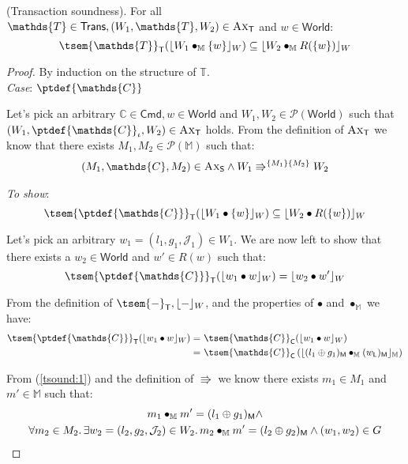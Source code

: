 \thm (Transaction soundness). For all $\mathds{T} \in \mathsf{Trans}, (W_1, \mathds{T}, W_2) \in \textsc{Ax}_\mathsf{T}$ and $w \in \mathsf{World}$:
\[
	\tsem{\mathds{T}}_\mathsf{T}(\lfloor W_1 \bullet_\mathbb{M} \{ w \} \rfloor_W) \subseteq \lfloor W_2 \bullet_\mathbb{M} R(\{ w \}) \rfloor_W
\]

{\parindent0pt
\begin{proof}
By induction on the structure of $\mathds{T}$. \\	

\textit{Case}: $\ptdef{\mathds{C}}$

Let's pick an arbitrary $\mathds{C} \in \mathsf{Cmd}, w \in \mathsf{World}$ and $W_1, W_2 \in \mathcal{P}(\mathsf{World})$ such that $(W_1, \ptdef{\mathds{C}}_\iota, W_2) \in \textsc{Ax}_\mathsf{T}$ holds. From the definition of $\textsc{Ax}_\mathsf{T}$ we know that there exists $M_1, M_2 \in \mathcal{P}(\mathbb{M})$ such that:
\begin{gather}\label{tsound:1}
	(M_1, \mathds{C}, M_2) \in \textsc{Ax}_\mathsf{S} \land W_1 \Rrightarrow^{\{M_1\}\{M_2\}} W_2
\end{gather}

\textit{To show}:
\[
	\tsem{\ptdef{\mathds{C}}}_\mathsf{T}(\lfloor W_1 \bullet \{w\} \rfloor_W) \subseteq \lfloor W_2 \bullet R(\{w\}) \rfloor_W
\]

Let's pick an arbitrary $w_1 = (l_1, g_1, \mathcal{J}_1) \in W_1$. We are now left to show that there exists a $w_2 \in \mathsf{World}$ and $w' \in R(w)$ such that:
\[
	\tsem{\ptdef{\mathds{C}}}_\mathsf{T}(\lfloor w_1 \bullet w \rfloor_W) = \lfloor w_2 \bullet w' \rfloor_W
\]

From the definition of $\tsem{-}_\mathsf{T}, \lfloor - \rfloor_W$, and the properties of $\bullet$ and $\bullet_\mathbb{M}$ we have:
\begin{align}
	\tsem{\ptdef{\mathds{C}}}_\mathsf{T}(\lfloor w_1 \bullet w \rfloor_W) =\
		&\tsem{\mathds{C}}_\mathsf{C}(\lfloor w_1 \bullet w \rfloor_W) \\
		\label{tsound:2} =\ &\tsem{\mathds{C}}_\mathsf{C}\left( \lfloor (l_1 \oplus g_1)_\mathsf{M} \bullet_\mathbb{M} (w_\mathsf{L})_\mathsf{M} \rfloor_\mathbb{M} \right)
\end{align}

From (\ref{tsound:1}) and the definition of $\Rrightarrow$ we know there exists $m_1 \in M_1$ and $m' \in \mathbb{M}$ such that:
\begin{gather}
\label{tsound:3} m_1 \bullet_\mathbb{M} m' = (l_1 \oplus g_1)_\mathsf{M} \land \\
\label{tsound:4} \forall m_2 \in M_2 \ldotp \exists w_2 = (l_2, g_2, \mathcal{J}_2) \in W_2 \ldotp m_2 \bullet_\mathbb{M} m' = (l_2 \oplus g_2)_\mathsf{M} \land (w_1, w_2) \in G
\end{gather}


\end{proof}}
